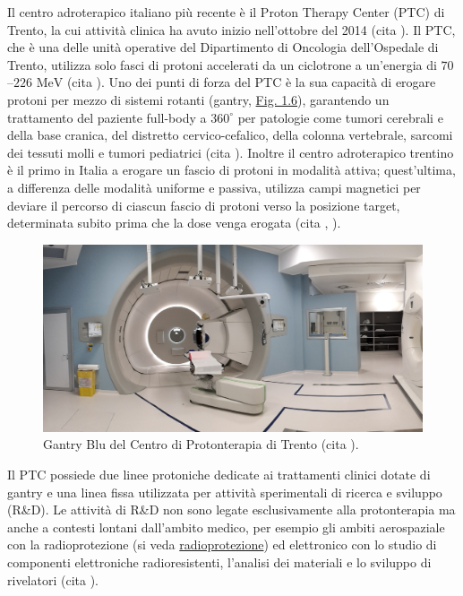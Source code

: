 \documentclass[12pt,a4paper,twoside]{report}
\begin{document}
	Il centro adroterapico italiano più recente è il Proton Therapy Center (PTC) di Trento, la cui attività clinica ha avuto inizio nell'ottobre del 2014 (cita
	). Il PTC, che è una delle unità operative del Dipartimento di Oncologia dell'Ospedale di Trento, utilizza solo fasci di protoni accelerati da un ciclotrone a un'energia di $70$--$226 \mbox{ MeV}$ (cita
	). Uno dei punti di forza del PTC è la sua capacità di erogare protoni per mezzo di sistemi rotanti (gantry, \hyperref[fig:gantry]{Fig. 1.6}), garantendo un trattamento del paziente full-body a $360^\circ$ per patologie come tumori cerebrali e della base cranica, del distretto cervico-cefalico, della colonna vertebrale, sarcomi dei tessuti molli e tumori pediatrici (cita
	). Inoltre il centro adroterapico trentino è il primo in Italia a erogare un fascio di protoni in modalità attiva; quest'ultima, a differenza delle modalità uniforme e passiva, utilizza campi magnetici per deviare il percorso di ciascun fascio di protoni verso la posizione target, determinata subito prima che la dose venga erogata (cita	%
	,
	).
	
	\begin{figure}[H]
		\centering
		\includegraphics[width=0.9\linewidth]{images/gantry.jpg}
		\caption{Gantry Blu del Centro di Protonterapia di Trento (cita
			).}
		\label{fig:gantry}
	\end{figure}
	
	Il PTC possiede due linee protoniche dedicate ai trattamenti clinici dotate di gantry e una linea fissa utilizzata per attività sperimentali di ricerca e sviluppo (R\&D). Le attività di R\&D non sono legate esclusivamente alla protonterapia ma anche a contesti lontani dall'ambito medico, per esempio gli ambiti aerospaziale con la radioprotezione (si veda \hyperref[label]{radioprotezione}) ed elettronico con lo studio di componenti elettroniche radioresistenti, l'analisi dei materiali e lo sviluppo di rivelatori (cita
	). 
	
\end{document}
